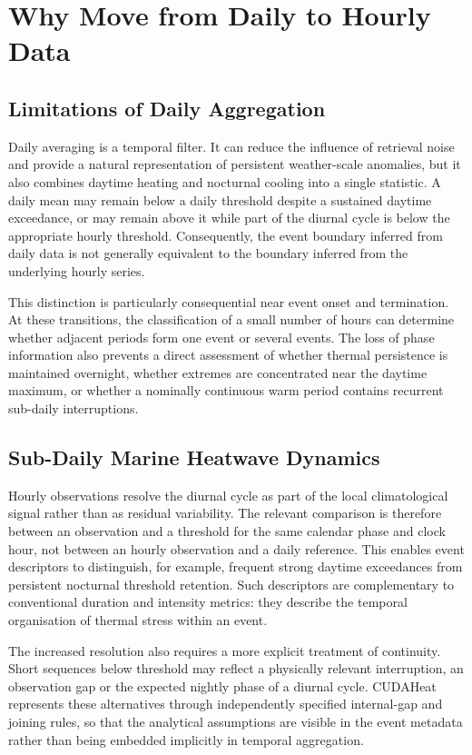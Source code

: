 \section{Why Move from Daily to Hourly Data}

\subsection{Limitations of Daily Aggregation}

Daily averaging is a temporal filter. It can reduce the influence of retrieval noise and provide a natural representation of persistent weather-scale anomalies, but it also combines daytime heating and nocturnal cooling into a single statistic. A daily mean may remain below a daily threshold despite a sustained daytime exceedance, or may remain above it while part of the diurnal cycle is below the appropriate hourly threshold. Consequently, the event boundary inferred from daily data is not generally equivalent to the boundary inferred from the underlying hourly series.

This distinction is particularly consequential near event onset and termination. At these transitions, the classification of a small number of hours can determine whether adjacent periods form one event or several events. The loss of phase information also prevents a direct assessment of whether thermal persistence is maintained overnight, whether extremes are concentrated near the daytime maximum, or whether a nominally continuous warm period contains recurrent sub-daily interruptions.

\subsection{Sub-Daily Marine Heatwave Dynamics}

Hourly observations resolve the diurnal cycle as part of the local climatological signal rather than as residual variability. The relevant comparison is therefore between an observation and a threshold for the same calendar phase and clock hour, not between an hourly observation and a daily reference. This enables event descriptors to distinguish, for example, frequent strong daytime exceedances from persistent nocturnal threshold retention. Such descriptors are complementary to conventional duration and intensity metrics: they describe the temporal organisation of thermal stress within an event.

The increased resolution also requires a more explicit treatment of continuity. Short sequences below threshold may reflect a physically relevant interruption, an observation gap or the expected nightly phase of a diurnal cycle. CUDAHeat represents these alternatives through independently specified internal-gap and joining rules, so that the analytical assumptions are visible in the event metadata rather than being embedded implicitly in temporal aggregation.

